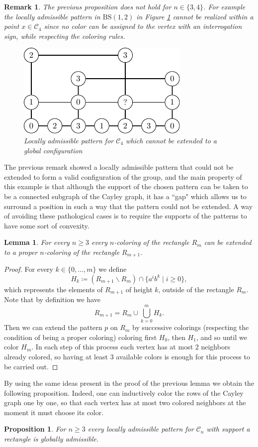 \documentclass[cupthm,crop,info]{CUP-JNL-ETS}%
\theoremstyle{cupplain}
\newtheorem{lemma}[theorem]{Lemma}
\newtheorem{proposition}[theorem]{Proposition}
\theoremstyle{cupdefinition}
\theoremstyle{cupremark}
\newtheorem{remark}[theorem]{Remark}
\theoremstyle{cupproof}
\newtheorem{proof}{Proof}
\numberwithin{equation}{section}
\newcommand{\BS}[1][N]{\mathrm{BS}(1,#1)}
\begin{document}
\begin{remark} The previous proposition does not hold for $n\in \{3,4\}$. For example the locally admissible pattern in $\BS[2]$ in Figure \ref{fig:no_extend_gap} cannot be realized within a point $x \in \mathcal{C}_4$ since no color can be assigned to the vertex with an interrogation sign, while respecting the coloring rules.
	\begin{figure}
		\centering
		\includegraphics{non_globallyadmissible.pdf}
		\caption{Locally admissible pattern for $\mathcal{C}_4$ which cannot be extended to a global configuration}
		\label{fig:no_extend_gap}
	\end{figure}	
\end{remark}
The previous remark showed a locally admissible pattern that could not be extended to form a valid configuration of the group, and the main property of this example is that although the support of the chosen pattern can be taken to be a connected subgraph of the Cayley graph, it has a ``gap" which allows us to surround a position in such a way that the pattern could not be extended. A way of avoiding these pathological cases is to require the supports of the patterns to have some sort of convexity.
\begin{lemma} \label{lem:gcs_extend_to_rectangles} For every $n\ge 3$ every $n$-coloring of the rectangle $R_m$ can be extended to a proper $n$-coloring of the rectangle $R_{m+1}$.
\end{lemma}
\begin{proof}
	For every $k\in \{0,\ldots,m\}$ we define $$H_k\coloneqq \left(R_{m+1}\backslash R_{m}\right)\cap \{a^ib^k\mid i\ge 0\},$$
	which represents the elements of $R_{m+1}$ of height $k$, outside of the rectangle $R_m$. Note that by definition we have $$R_{m+1}=R_m\cup \bigcup_{k=0}^{m}H_k.$$ Then we can extend the pattern $p$ on $R_m$ by successive colorings (respecting the condition of being a proper coloring) coloring first $H_0$, then $H_1$, and so until we color $H_m$. In each step of this process each vertex has at most $2$ neighbors already colored, so having at least $3$ available colors is enough for this process to be carried out. 
\end{proof}
By using the same ideas present in the proof of the previous lemma we obtain the following proposition. Indeed, one can inductively color the rows of the Cayley graph one by one, so that each vertex has at most two colored neighbors at the moment it must choose its color. 
\begin{proposition}\label{prop:gcs_rectangle_extension} For $n\ge 3$ every locally admissible pattern for $\mathcal{C}_n$ with support a rectangle is globally admissible.
\end{proposition}
\end{document}
